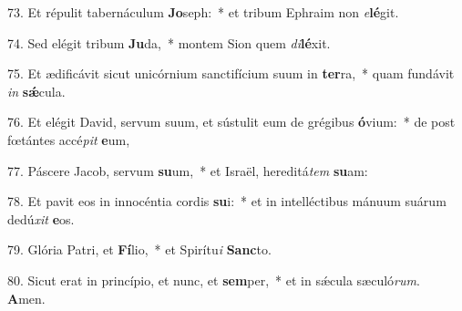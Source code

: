 73. Et répulit tabernáculum \textbf{Jo}seph:~*  et tribum Ephraim non \textit{e}\textbf{lé}git.\

74. Sed elégit tribum \textbf{Ju}da,~*  montem Sion quem \textit{di}\textbf{lé}xit.\

75. Et ædificávit sicut unicórnium sanctifícium suum in \textbf{ter}ra,~*  quam fundávit \textit{in} \textbf{sǽ}cula.\

76. Et elégit David, servum suum, et sústulit eum de grégibus \textbf{ó}vium:~*  de post fœtántes accé\textit{pit} \textbf{e}um,\

77. Páscere Jacob, servum \textbf{su}um,~*  et Israël, hereditá\textit{tem} \textbf{su}am:\

78. Et pavit eos in innocéntia cordis \textbf{su}i:~*  et in intelléctibus mánuum suárum dedú\textit{xit} \textbf{e}os.\

79. Glória Patri, et \textbf{Fí}lio,~*  et Spirítu\textit{i} \textbf{Sanc}to.\

80. Sicut erat in princípio, et nunc, et \textbf{sem}per,~*  et in sǽcula sæculó\textit{rum}. \textbf{A}men.\

